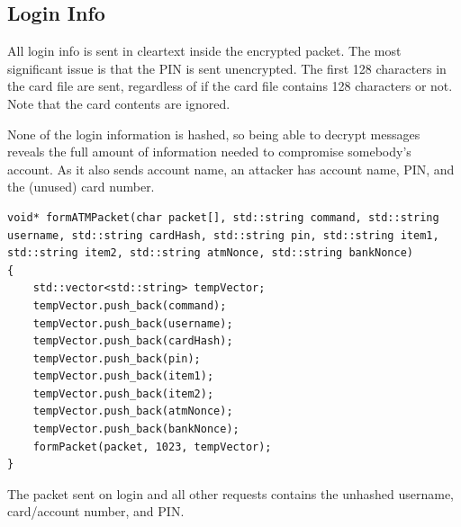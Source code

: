 \documentclass{article}
\begin{document}
\subsection{Login Info}
All login info is sent in cleartext inside the encrypted packet. The most 
significant issue is that the PIN is sent unencrypted. The first 128 characters 
in the card file are sent, regardless of if the card file contains 128 characters 
or not. Note that the card contents are ignored. 

None of the login information is hashed, so being able to decrypt messages reveals 
the full amount of information needed to compromise somebody's account. As it also 
sends account name, an attacker has account name, PIN, and the (unused) card number.
\begin{lstlisting}
void* formATMPacket(char packet[], std::string command, std::string username, std::string cardHash, std::string pin, std::string item1, std::string item2, std::string atmNonce, std::string bankNonce)
{
    std::vector<std::string> tempVector;
    tempVector.push_back(command);
    tempVector.push_back(username);
    tempVector.push_back(cardHash);
    tempVector.push_back(pin);
    tempVector.push_back(item1);
    tempVector.push_back(item2);
    tempVector.push_back(atmNonce);
    tempVector.push_back(bankNonce);
    formPacket(packet, 1023, tempVector);
}
\end{lstlisting}
The packet sent on login and all other requests contains the unhashed username, card/account number, and PIN.
\end{document}
